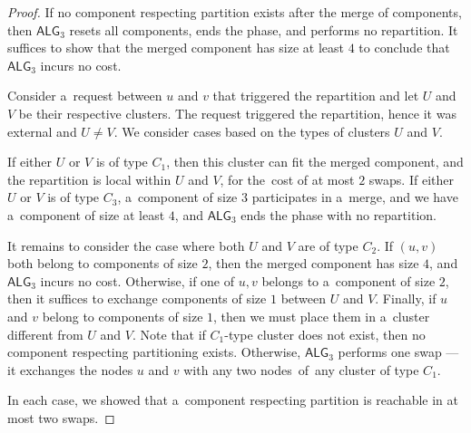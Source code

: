 \documentclass[a4paper,anonymous,USenglish]{lipics-v2019}
\newcommand{\TAlg}{{\ensuremath{\textsf{ALG}_{3}}}\xspace}
\begin{document}
\begin{proof}
	If no component respecting partition exists after the merge of components, then \TAlg resets all components, ends the phase, and performs no repartition.
	It suffices to show that the merged component has size at least $4$ to conclude that \TAlg incurs no cost.
	
	
	Consider a~request between $u$ and $v$ that triggered the repartition and let $U$ and $V$ be their respective clusters.
	The request triggered the repartition, hence it was external and $U\neq V$.
	We consider cases based on the types of clusters $U$ and $V$.
	
	If either $U$ or $V$ is of type $C_1$, then this cluster can fit the merged component, and the repartition is local within $U$ and $V$, for the~cost of at most $2$ swaps.
	If either $U$ or $V$ is of type $C_3$, a~component of size $3$ participates in a~merge, and we have a~component of size at least $4$, and \TAlg ends the phase with no repartition.
	
	\pagebreak
	
	It remains to consider the case where both $U$ and $V$ are of type $C_2$.
	If $(u,v)$ both belong to components of size $2$, then the merged component has size $4$, and \TAlg incurs no cost. 
	Otherwise, if one of $u,v$ belongs to a~component of size $2$, then it suffices to exchange components of size $1$ between $U$ and $V$.
	Finally, if $u$ and $v$ belong to components of size $1$, then we must place them in a~cluster different from $U$ and $V$.
	Note that if $C_1$-type cluster does not exist, then no component respecting partitioning exists.
	Otherwise, \TAlg performs one swap --- it exchanges the nodes $u$ and $v$ with any two nodes~of~any cluster of type $C_1$.

	In each case, we showed that a~component respecting partition is reachable in at most two swaps.
\end{proof}



\end{document}
